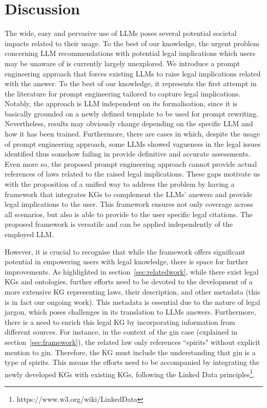 \documentclass[sn-mathphys-num]{sn-jnl}%
\begin{document}
\section{Discussion}\label{sec:discussion}

The wide, easy and pervasive use of LLMs poses several potential societal impacts related to their usage. To the best of our knowledge, the urgent problem concerning LLM recommendations with potential legal implications which users may be unaware of is currently largely unexplored. We introduce a prompt engineering approach that forces existing LLMs to raise legal implications related with the answer. To the best of our knowledge, it represents the first attempt in the literature for prompt engineering tailored to capture legal implications. Notably, the approach is LLM independent on its formalisation, since it is basically grounded on a newly defined template to be used for prompt rewriting. Nevertheless, results may obviously change depending on the specific LLM and how it has been trained. 
Furthermore, there are cases in which, despite the usage of prompt engineering approach, some LLMs showed vagueness in the legal issues identified thus somehow failing in provide definitive and accurate assessments. Even more so, the proposed prompt engineering approach cannot provide actual references of laws related to the raised legal implications. These gaps motivate us with the proposition of a unified way to address the problem by having a framework that integrates KGs to complement the LLMs' answers and provide legal implications to the user. This framework ensures not only coverage across all scenarios, but also is able to provide to the user specific legal citations. 
The proposed framework is versatile and can be applied independently of the employed LLM. 

However, it is crucial to recognise that while the framework offers significant potential in empowering users with legal knowledge, there is space for further improvements.  As highlighted in section~\ref{sec:relatedwork}, while there exist legal KGs and ontologies, further efforts need to be devoted to the development of a more extensive KG representing laws, their description, and other metadata (this is in fact our ongoing work). This metadata is essential due to the nature of legal jargon, which poses challenges in its translation to LLMs answers. 
Furthermore, there is a need to enrich this legal KG by incorporating information from different sources. For instance, in the context of the gin case (explained in section~\ref{sec:framework}), the related law only references ``spirits" without explicit mention to gin. Therefore, the KG must include the understanding that gin is a type of spirits. This means the efforts need to be accompanied by integrating the newly developed KGs with existing KGs, following the Linked Data principles\footnote{https://www.w3.org/wiki/LinkedData}. 
\end{document}
